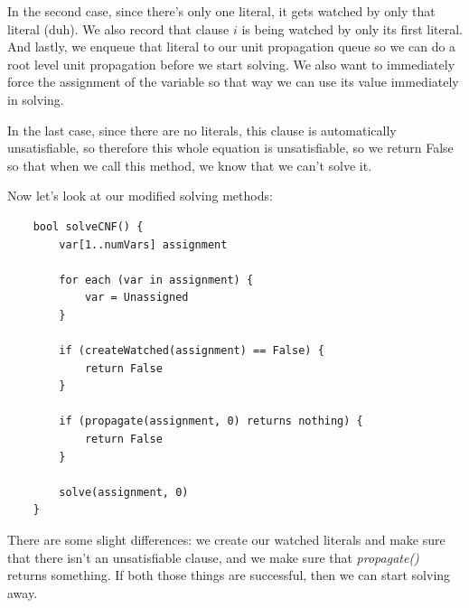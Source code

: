 \documentclass[../main.tex]{subfiles}
\begin{document}
In the second case, since there's only one literal, it gets watched by only that 
literal (duh). We also record that clause $i$ is being watched by only its first literal.
And lastly, we enqueue that literal to our unit propagation queue so we can do a root 
level unit propagation before we start solving. We also want to immediately force the 
assignment of the variable so that way we can use its value immediately in solving.

In the last case, since there are no literals, this clause is automatically unsatisfiable, 
so therefore this whole equation is unsatisfiable, so we return False so that when we call 
this method, we know that we can't solve it. 

Now let's look at our modified solving methods:

\begin{lstlisting}
    bool solveCNF() {
        var[1..numVars] assignment

        for each (var in assignment) {
            var = Unassigned
        }

        if (createWatched(assignment) == False) {
            return False
        }

        if (propagate(assignment, 0) returns nothing) {
            return False
        }

        solve(assignment, 0)
    }
\end{lstlisting}

There are some slight differences: we create our watched literals and make sure 
that there isn't an unsatisfiable clause, and we make sure that \textit{propagate()}
returns something. If both those things are successful, then we can start solving away.
\end{document}
